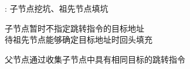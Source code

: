\begin{frame}{}
  \begin{center}
    : {子节点挖坑、祖先节点填坑}


    \pause
    子节点暂时不指定跳转指令的目标地址 \\[5pt]
    待祖先节点能够确定目标地址时回头填充

    \pause
    \vspace{0.80cm}
    父节点通过收集子节点中具有相同目标的跳转指令
  \end{center}
\end{frame}

\begin{frame}{}
\end{frame}

\begin{frame}{}
\end{frame}
